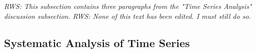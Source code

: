 \documentclass{ametsoc}
\begin{document}

\emph{RWS: This subsection contains three paragraphs from the "Time Series Analysis" discussion subsection.}
\emph{RWS: None of this text has been edited. I must still do so.}
\subsection{Systematic Analysis of Time Series}

\end{document}
